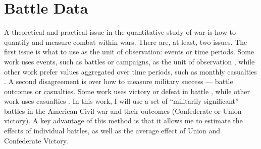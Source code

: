 \section{Battle Data}
\label{bonds_battles:sec:battle-data}

A theoretical and practical issue in the quantitative study of war is how to quantify and measure combat within wars.
There are, at least, two issues.
The first issue is what to use as the unit of observation: events or time periods.
Some work uses events, such as battles or campaigns, as the unit of observation \parencites{ReiterStam1998}{ReiterStam2002}{Ramsay2008}{PilsterBoehmelt2011a}{GrauerHorowitz2012}, while other work prefer values aggregated over time periods, \eg{} such as monthly casualties \textcite{Weisiger2015}.
A second disagreement is over how to measure military success --- battle outcomes or casualties.
Some work uses victory or defeat in battle \parencites{ReiterStam1998}{ReiterStam2002}{GrauerHorowitz2012}, while other work uses casualties \parencites{Biddle2004}{BiddleLong2004}{PilsterBoehmelt2011a}.
In this work, I will use a set of ``militarily significant'' battles in the American Civil war and their outcomes (Confederate or Union victory).
A key advantage of this method is that it allows me to estimate the effects of individual battles, as well as the average effect of Union and Confederate Victory.

